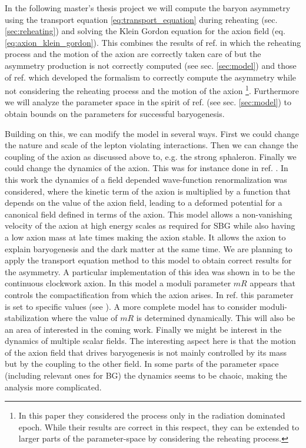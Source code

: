\documentclass[13pt,a4paper,titlepage]{article}
\begin{document}
In the following master's thesis project we will compute the baryon asymmetry using the transport equation \eqref{eq:transport_equation} during reheating (sec. \ref{sec:reheating}) and
solving the Klein Gordon equation for the axion field (eq. \eqref{eq:axion_klein_gordon}).
This combines the results of ref. \cite{Axion_leptogenesis_Kusenko_2015} in which the reheating process and the motion of the axion are correctly taken care of but the asymmetry production
is not correctly computed (see sec. \ref{sec:model}) and those of
ref. \cite{Domcke:2020kcp_Generic_Couplings} which developed the formalism to correctly compute
the asymmetry while not considering the reheating process and the motion of the
axion \footnote{In this paper they considered the process only in the radiation dominated epoch. While their results are correct in this respect, they can be extended to larger parts of the parameter-space by considering the reheating process.}.
Furthermore we will analyze the parameter space in the spirit of ref. \cite{Axion_leptogenesis_Kusenko_2015} (see sec. \ref{sec:model}) to obtain bounds
on the parameters for successful baryogenesis.

Building on this, we can modify the model in several ways.
First we could change the nature and scale of the lepton violating interactions.
Then we can change the coupling of the axion as discussed above to, e.g. the strong sphaleron.
Finally we could change the dynamics of the axion. This was for instance done in ref. \cite{Deformed_potential_Bae_2019}.
In this work the dynamics of a field depended wave-function renormalization was considered,
where the kinetic term of the axion is multiplied by a function that depends on the value of
the axion field, leading to a deformed potential for a canonical field defined in terms of
the axion.
This model allows a non-vanishing velocity of the axion at high energy scales as required for
SBG while also having a low axion mass at late times making the axion stable.
It allows the axion to explain baryogenesis and the dark matter at the same time.
We are planning to apply the transport equation method to this model to obtain correct results
for the asymmetry. A particular implementation of this idea was shown in \cite[sec III]{Deformed_potential_Bae_2019} to be the continuous clockwork axion.
In this model a moduli parameter $mR$ appears that controls the compactification from which the
axion arises. In ref. \cite{Deformed_potential_Bae_2019} this parameter is
set to specific values (see \cite[fig. 2]{Deformed_potential_Bae_2019}).
A more complete model has to consider moduli-stabilization where the value of $mR$ is determined dynamically. This will also be an area of interested in the coming work.
Finally we might be interest in the dynamics of multiple scalar fields.
The interesting aspect here is that the motion of the axion field that drives baryogenesis
is not mainly controlled by its mass but by the coupling to the other field. In some parts of
the parameter space (including relevant ones for BG) the dynamics seems to be chaoic, making
the analysis more complicated.
\end{document}
